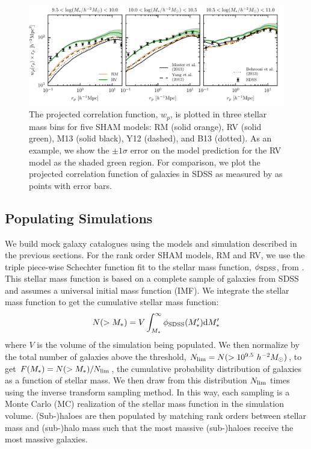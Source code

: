 \documentclass[useAMS,fleqn,usenatbib]{mnras}
\begin{document}
\begin{figure}
    \includegraphics[width=\textwidth]{figures/wp_comparison.pdf}
    \caption{The projected correlation function, $w_p$, is plotted in three stellar mass bins for five SHAM models: RM (solid orange), RV (solid green), M13 (solid black), Y12 (dashed), and B13 (dotted).  As an example, we show the $\pm 1\sigma$ error on the model prediction for the RV model as the shaded green region.  For comparison, we plot the projected correlation function of galaxies in SDSS as measured by \citet{Yang:2012ew} as points with error bars.}
    \label{fig:wp_comparison}
\end{figure}

\subsection{Populating Simulations}
\label{sec:pop}

We build mock galaxy catalogues using the models and simulation described in the previous sections.  For the rank order SHAM models, RM and RV, we use the triple piece-wise Schechter function fit to the stellar mass function, $\phi_{\rm SDSS}$, from \citet[][LW09 hereafter]{Li:2009kh}.  This stellar mass function is based on a complete sample of galaxies from SDSS \citep{York:2000gn} and assumes a universal \citet{Chabrier:2003ki} initial mass function (IMF).  We integrate the stellar mass function to get the cumulative stellar mass function:
%
\begin{equation}
N(>M_*) = V\int_{M_*}^{\infty} \phi_{\rm SDSS}(M_*^{\prime}) \mathrm{d}M_*^{\prime}
\end{equation}
%
where $V$ is the volume of the simulation being populated.  We then normalize by the total number of galaxies above the threshold, $N_{\rm lim} = N(>10^{9.5}~h^{-2}M_{\odot})$, to get $F(M_*) = N(>M_*)/N_{\rm lim}$, the cumulative probability distribution of galaxies as a function of stellar mass.  We then draw from this distribution $N_{\rm lim}$ times using the inverse transform sampling method.  In this way, each sampling is a Monte Carlo (MC) realization of the stellar mass function in the simulation volume.  (Sub-)haloes are then populated by matching rank orders between stellar mass and (sub-)halo mass such that the most massive (sub-)haloes receive the most massive galaxies.
\end{document}
